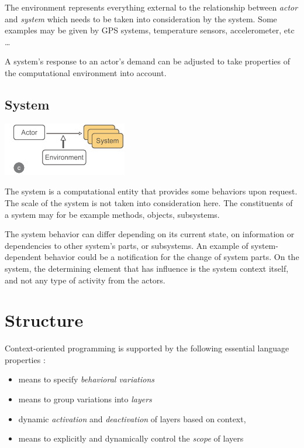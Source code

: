 \documentclass[journal,10pt,compsoc]{IEEEtran}
\begin{document}
The environment represents everything external to the relationship between \emph{actor} and \emph{system} which needs to be 
taken into consideration by the system. Some examples may be given by GPS systems, temperature sensors, accelerometer, etc \ldots{} 

A system's response to an actor's demand can be adjusted to take properties of the computational environment into account.

\subsection{System}
\label{sec:orgd54be30}
\begin{center}
\includegraphics[width=.9\linewidth]{./system.jpg}
\end{center}

The system is a computational entity that provides some behaviors upon request. The scale of the system is not taken into consideration
here. The constituents of a system may for be example methods, objects, subsystems.

The system behavior can differ depending on its current state, on information or dependencies to other system's parts, or subsystems.    
An example of system-dependent behavior could be a notification for the change of system parts.
On the system, the determining element that has influence is the system context itself, and not any type of activity from the actors. 

\section{Structure}
\label{sec:org89133bb}
Context-oriented programming is supported by the following essential language properties : 
\begin{itemize}
\item means to specify \emph{behavioral variations}
\item means to group variations into \emph{layers}
\item dynamic \emph{activation} and \emph{deactivation} of layers based on context,
\item means to explicitly and dynamically control the \emph{scope} of layers
\end{itemize}
\cite{hirschfeld2008context} 
\end{document}
